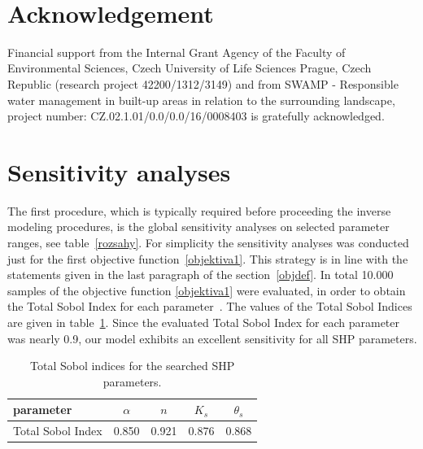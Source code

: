 \documentclass[review,times,3p,10pt]{elsarticle}
\begin{document}
\bigskip
~
\bigskip

\section{Acknowledgement}

Financial support from the Internal Grant Agency of the Faculty of Environmental Sciences, Czech University of Life Sciences Prague, Czech Republic (research project 42200/1312/3149) and from 
SWAMP - Responsible water management in built-up areas in relation to
the surrounding landscape, project number: CZ.02.1.01/0.0/0.0/16/0008403
is gratefully acknowledged.




 


\appendix
 \section{Sensitivity analyses} 

The first procedure, which is typically required before proceeding the inverse modeling procedures, is the global sensitivity analyses on  selected parameter ranges, see table~\ref{rozsahy}. For simplicity the sensitivity analyses was conducted just for the first objective function~\eqref{objektiva1}. This strategy is in line with the statements given in the last paragraph of the section~\ref{objdef}. In total 10.000 samples of the objective function \eqref{objektiva1}  were evaluated, in order to obtain the  Total Sobol Index for each parameter~\citep{kniha-citlivost}. The values of the Total Sobol Indices are given in table~\ref{citlivost}. Since the evaluated Total Sobol Index for each parameter was nearly 0.9, our model exhibits an excellent sensitivity for all SHP parameters. 

\begin{table}[ht]
\begin{center}
\caption{Total Sobol indices for the searched SHP parameters.}
\begin{small}
\doublespacing
\begin{tabular}{l||c c c c }
\toprule
parameter & $\alpha$ & $n$ & $K_s$ & $\theta_s$  \\ \hline
\toprule
Total Sobol Index & 0.850 & 0.921 & 0.876 & 0.868  \\
\toprule
\end{tabular}
\end{small}
\label{citlivost}
\end{center}
\end{table}
\end{document}
